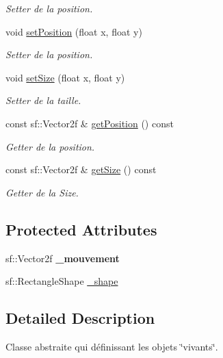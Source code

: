 \begin{DoxyCompactItemize}
\begin{DoxyCompactList}\small\item\em Setter de la position. \end{DoxyCompactList}\item 
void \hyperlink{class_alive_entity_a33f720218560af101a2a4ab040ad02d8}{set\+Position} (float x, float y)
\begin{DoxyCompactList}\small\item\em Setter de la position. \end{DoxyCompactList}\item 
void \hyperlink{class_alive_entity_acd80dd8cf81e081cf0369b3e20d45788}{set\+Size} (float x, float y)
\begin{DoxyCompactList}\small\item\em Setter de la taille. \end{DoxyCompactList}\item 
const sf\+::\+Vector2f \& \hyperlink{class_alive_entity_ac4d5ac19490963c25a49b07a2f6adfd9}{get\+Position} () const 
\begin{DoxyCompactList}\small\item\em Getter de la position. \end{DoxyCompactList}\item 
const sf\+::\+Vector2f \& \hyperlink{class_alive_entity_a5560db2181eefaf88d4fbf9410cfc96f}{get\+Size} () const 
\begin{DoxyCompactList}\small\item\em Getter de la Size. \end{DoxyCompactList}\end{DoxyCompactItemize}
\subsection*{Protected Attributes}
\begin{DoxyCompactItemize}
\item 
\hypertarget{class_alive_entity_ab7518854489cbe9ea8d057168caf9c5a}{sf\+::\+Vector2f {\bfseries \+\_\+mouvement}}\label{class_alive_entity_ab7518854489cbe9ea8d057168caf9c5a}

\item 
sf\+::\+Rectangle\+Shape \hyperlink{class_alive_entity_a0de4bf929f42b7a090c09d8805953128}{\+\_\+shape}
\end{DoxyCompactItemize}


\subsection{Detailed Description}
Classe abstraite qui définissant les objets \char`\"{}vivants\char`\"{}. 

